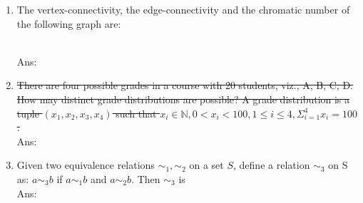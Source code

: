 \documentclass[10pt, letterpaper]{article}
\newcommand{\eat}[1]{}
\begin{document}
\begin{enumerate}\item The vertex-connectivity, the edge-connectivity and the chromatic number of the following graph are:
\begin{figure*}[h]
\centering
\end{figure*}\\
Ans:



\item \sout{There are four possible grades in a course with 20 students, viz., A, B, C, D. How may distinct grade distributions are possible? A grade distribution is a tuple $(x_1, x_2, x_3, x_4)$ such that $x_i \in \mathbb{N}, 0 < x_i < 100 , 1 \leq i \leq 4, \Sigma_{i=1}^4 x_i = 100$.} \\
Ans:



\item Given two equivalence relations $\sim_1, \sim_2$ on a set $S$, define a relation $\sim_3$ on S as: $a \sim_3 b$ if $a \sim_1 b$ and $a \sim_2 b$. Then $\sim_3$ is\\
Ans:

\begin{enumerate*}\item  3		
	
\item  5 \eat{*}


\end{enumerate*}
\end{enumerate}
\end{document}
